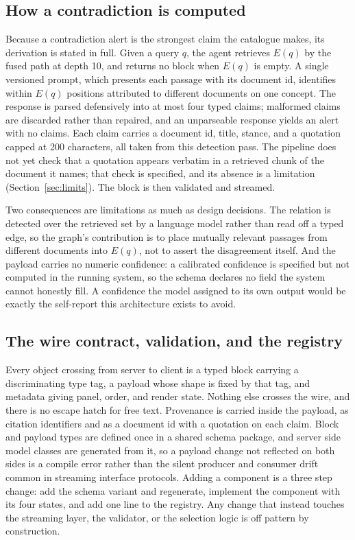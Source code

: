 \documentclass[conference]{IEEEtran}
\begin{document}
\subsection{How a contradiction is computed}
\label{sec:contra}
Because a contradiction alert is the strongest claim the catalogue makes, its derivation is stated in full. Given a query $q$, the agent retrieves $E(q)$ by the fused path at depth 10, and returns no block when $E(q)$ is empty. A single versioned prompt, which presents each passage with its document id, identifies within $E(q)$ positions attributed to different documents on one concept. The response is parsed defensively into at most four typed claims; malformed claims are discarded rather than repaired, and an unparseable response yields an alert with no claims. Each claim carries a document id, title, stance, and a quotation capped at 200 characters, all taken from this detection pass. The pipeline does not yet check that a quotation appears verbatim in a retrieved chunk of the document it names; that check is specified, and its absence is a limitation (Section~\ref{sec:limits}). The block is then validated and streamed.

Two consequences are limitations as much as design decisions. The relation is detected over the retrieved set by a language model rather than read off a typed edge, so the graph's contribution is to place mutually relevant passages from different documents into $E(q)$, not to assert the disagreement itself. And the payload carries no numeric confidence: a calibrated confidence is specified but not computed in the running system, so the schema declares no field the system cannot honestly fill. A confidence the model assigned to its own output would be exactly the self-report this architecture exists to avoid.

\subsection{The wire contract, validation, and the registry}
Every object crossing from server to client is a typed block carrying a discriminating type tag, a payload whose shape is fixed by that tag, and metadata giving panel, order, and render state. Nothing else crosses the wire, and there is no escape hatch for free text. Provenance is carried inside the payload, as citation identifiers and as a document id with a quotation on each claim. Block and payload types are defined once in a shared schema package, and server side model classes are generated from it, so a payload change not reflected on both sides is a compile error rather than the silent producer and consumer drift common in streaming interface protocols. Adding a component is a three step change: add the schema variant and regenerate, implement the component with its four states, and add one line to the registry. Any change that instead touches the streaming layer, the validator, or the selection logic is off pattern by construction.
\end{document}
